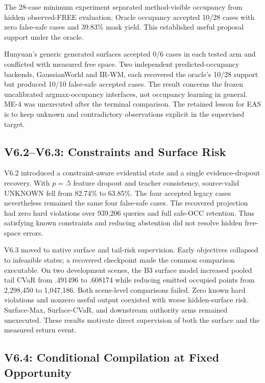 The 28-case minimum experiment separated method-visible occupancy from hidden observed-FREE evaluation.
Oracle occupancy accepted 10/28 cases with zero false-safe cases and 39.83\% mask yield.
This established useful proposal support under the oracle.

Hunyuan's generic generated surfaces accepted 0/6 cases in each tested arm and conflicted with measured free space.
Two independent predicted-occupancy backends, GaussianWorld and IR-WM, each recovered the oracle's 10/28 support
but produced 10/10 false-safe accepted cases.
The result concerns the frozen uncalibrated argmax-occupancy interfaces, not occupancy learning in general.
ME-4 was unexecuted after the terminal comparison.
The retained lesson for EAS is to keep unknown and contradictory observations explicit in the supervised target.

\subsection{V6.2--V6.3: Constraints and Surface Risk}

V6.2 introduced a constraint-aware evidential state and a single evidence-dropout recovery.
With $p=.5$ feature dropout and teacher consistency, source-valid UNKNOWN fell from 82.74\% to 63.85\%.
The four accepted legacy cases nevertheless remained the same four false-safe cases.
The recovered projection had zero hard violations over 939,206 queries and full safe-OCC retention.
Thus satisfying known constraints and reducing abstention did not resolve hidden free-space errors.

V6.3 moved to native surface and tail-risk supervision.
Early objectives collapsed to infeasible states; a recovered checkpoint made the common comparison executable.
On two development scenes, the B3 surface model increased pooled tail CVaR from .491496 to .608174
while reducing emitted occupied points from 2,298,450 to 1,047,186.
Both scene-level comparisons failed. Zero known hard violations and nonzero useful output coexisted
with worse hidden-surface risk. Surface-Max, Surface-CVaR, and downstream authority arms remained unexecuted.
These results motivate direct supervision of both the surface and the measured return event.

\subsection{V6.4: Conditional Compilation at Fixed Opportunity}

